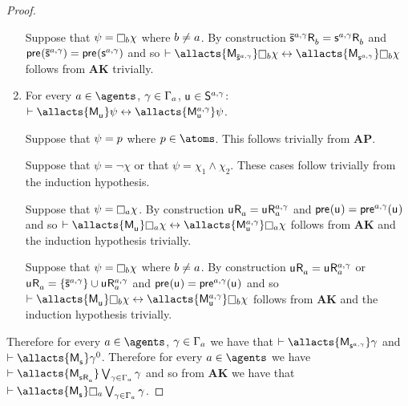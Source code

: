 \begin{proof}
\begin{enumerate}
            Suppose that $\psi = \necessary[\agentB] \chi$ where $b \neq a$.
            By construction $\aPStateS[\agentA,\gamma] \aAccessibility{\agentB} = \aStateS[\agentA,\gamma] \aAccessibility{\agentB}$ and $\aPrecondition(\aPStateS[\agentA,\gamma]) = \aPrecondition(\aStateS[\agentA,\gamma])$ and so $\proves \allacts{\aPModel{\aPStateS[\agentA,\gamma]}} \necessary[\agentB] \chi \iff \allacts{\aPModel{\aStateS[\agentA,\gamma]}} \necessary[\agentB] \chi$ follows from {\bf AK} trivially.

        \item For every $\agentA \in \agents$, $\gamma \in \Gamma_a$, $\aStateU \in \aStates[\agentA,\gamma]$: $\proves \allacts{\aPModel{\aStateU}} \psi \iff \allacts{\aPModel[\agentA,\gamma]{\aStateU}} \psi$.

            Suppose that $\psi = p$ where $\atomP \in \atoms$. 
            This follows trivially from {\bf AP}.

            Suppose that $\psi = \neg \chi$ or that $\psi = \chi_1 \land \chi_2$. These cases follow trivially from the induction hypothesis.

            Suppose that $\psi = \necessary[\agentA] \chi$.
            By construction $\aStateU \aAccessibility{\agentA} = \aStateU \aAccessibility[\agentA,\gamma]{\agentA}$ and $\aPrecondition(\aStateU) = \aPrecondition[\agentA,\gamma](\aStateU)$ and so $\proves \allacts{\aPModel{\aStateU}} \necessary[\agentA] \chi \iff \allacts{\aPModel[\agentA,\gamma]{\aStateU}} \necessary[\agentA] \chi$ follows from {\bf AK} and the induction hypothesis trivially.

            Suppose that $\psi = \necessary[\agentB] \chi$ where $b \neq a$.
            By construction $\aStateU \aAccessibility{\agentA} = \aStateU \aAccessibility[\agentA,\gamma]{\agentA}$ or $\aStateU \aAccessibility{\agentA} = \{\aPStateS[\agentA,\gamma]\} \cup \aStateU \aAccessibility[\agentA,\gamma]{\agentA}$ and $\aPrecondition(\aStateU) = \aPrecondition[\agentA,\gamma](\aStateU)$ and so $\proves \allacts{\aPModel{\aStateU}} \necessary[\agentB] \chi \iff \allacts{\aPModel[\agentA,\gamma]{\aStateU}} \necessary[\agentB] \chi$ follows from {\bf AK} and the induction hypothesis trivially.
    \end{enumerate}

    Therefore for every $\agentA \in \agents$, $\gamma \in \Gamma_a$ we have that $\proves \allacts{\aPModel{\aStateS[\agentA,\gamma]}} \gamma$ and $\proves \allacts{\aPModel{\aStateS}} \gamma^0$.
    Therefore for every $\agentA \in \agents$ we have $\proves \allacts{\aPModel{\aStateS \aAccessibility{\agentA}}} \bigvee_{\gamma \in \Gamma_\agentA} \gamma$ and so from {\bf AK} we have that $\proves \allacts{\aPModel{\aStateS}} \necessary[\agentA] \bigvee_{\gamma \in \Gamma_\agentA} \gamma$.


\end{proof}

